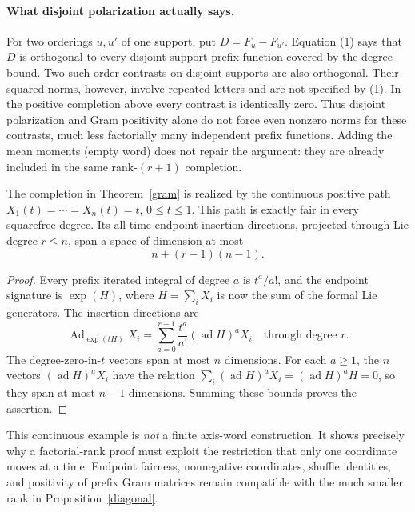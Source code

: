 \documentclass[11pt]{article}
\newcommand{\Ad}{\operatorname{Ad}}\newcommand{\ad}{\operatorname{ad}}
\begin{document}
\paragraph{What disjoint polarization actually says.}
For two orderings $u,u'$ of one support, put $D=F_u-F_{u'}$.
Equation (1) says that $D$ is orthogonal to every disjoint-support
prefix function covered by the degree bound. Two such order contrasts
on disjoint supports are also orthogonal. Their squared norms, however,
involve repeated letters and are not specified by (1). In the
positive completion above every contrast is identically zero.
Thus disjoint polarization and Gram positivity alone do not force
even nonzero norms for these contrasts, much less factorially many
independent prefix functions. Adding the mean moments (empty word)
does not repair the argument: they are already included in the same
rank-$(r+1)$ completion.

\begin{proposition}\label{diagonal}
The completion in Theorem~\ref{gram} is realized by the continuous
positive path $X_1(t)=\cdots=X_n(t)=t$, $0\le t\le1$. This path is
exactly fair in every squarefree degree. Its all-time endpoint
insertion directions, projected through Lie degree $r\le n$, span
a space of dimension at most
\[
 n+(r-1)(n-1).
\]
\end{proposition}
\begin{proof}
Every prefix iterated integral of degree $a$ is $t^a/a!$, and the
endpoint signature is $\exp(H)$, where $H=\sum_iX_i$ is now the
sum of the formal Lie generators. The insertion directions are
\[
 \Ad_{\exp(tH)}X_i
   =\sum_{a=0}^{r-1}\frac{t^a}{a!}(\ad H)^aX_i
                       \quad\text{through degree }r.
\]
The degree-zero-in-$t$ vectors span at most $n$ dimensions.
For each $a\ge1$, the $n$ vectors $(\ad H)^aX_i$ have the relation
$\sum_i(\ad H)^aX_i=(\ad H)^aH=0$, so they span at most $n-1$
dimensions. Summing these bounds proves the assertion.
\end{proof}

This continuous example is \emph{not} a finite axis-word construction.
It shows precisely why a factorial-rank proof must exploit the
restriction that only one coordinate moves at a time. Endpoint
fairness, nonnegative coordinates, shuffle identities, and positivity
of prefix Gram matrices remain compatible with the much smaller
rank in Proposition~\ref{diagonal}.
\end{document}
